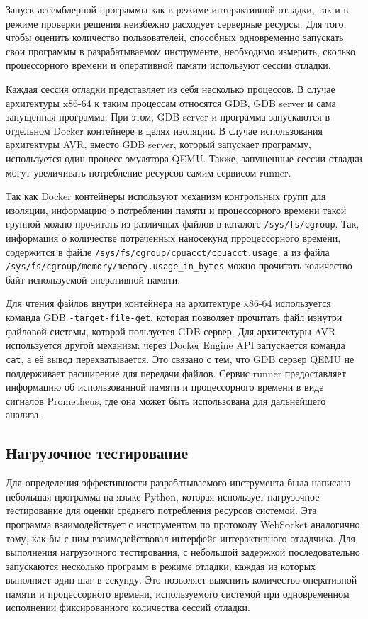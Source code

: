 \documentclass[a4paper,article,14pt]{extarticle}
\begin{document}
Запуск ассемблерной программы как в режиме интерактивной отладки, так и в режиме проверки решения неизбежно расходует серверные ресурсы. Для того, чтобы оценить количество пользователей, способных одновременно запускать свои программы в разрабатываемом инструменте, необходимо измерить, сколько процессорного времени и оперативной памяти используют сессии отладки.

Каждая сессия отладки представляет из себя несколько процессов. В случае архитектуры x86-64 к таким процессам относятся GDB, GDB server и сама запущенная программа. При этом, GDB server и программа запускаются в отдельном Docker контейнере в целях изоляции. В случае использования архитектуры AVR, вместо GDB server, который запускает программу, используется один процесс эмулятора QEMU. Также, запущенные сессии отладки могут увеличивать потребление ресурсов самим сервисом runner.

Так как Docker контейнеры используют механизм контрольных групп для изоляции, информацию о потреблении памяти и процессорного времени такой группой можно прочитать из различных файлов в каталоге \texttt{/sys/fs/cgroup}. Так, информация о количестве потраченных наносекунд прроцессорного времени, содержится в файле \texttt{/sys/fs/cgroup/cpuacct/cpuacct.usage}, а из файла \texttt{/sys/fs/cgroup/memory/memory.usage\_in\_bytes} можно прочитать количество байт используемой оперативной памяти.

Для чтения файлов внутри контейнера на архитектуре x86-64 используется команда GDB \texttt{-target-file-get}, которая позволяет прочитать файл изнутри файловой системы, которой пользуется GDB сервер. Для архитектуры AVR используется другой механизм: через Docker Engine API запускается команда \texttt{cat}, а её вывод перехватывается. Это связано с тем, что GDB сервер QEMU не поддерживает расширение для передачи файлов. Сервис runner предоставляет информацию об использованной памяти и процессорного времени в виде сигналов Prometheus, где она может быть использована для дальнейшего анализа.

\subsection{Нагрузочное тестирование}

Для определения эффективности разрабатываемого инструмента была написана небольшая программа на языке Python, которая использует нагрузочное тестирование для оценки среднего потребления ресурсов системой. Эта программа взаимодействует с инструментом по протоколу WebSocket аналогично тому, как бы с ним взаимодействовал интерфейс интерактивного отладчика. Для выполнения нагрузочного тестирования, с небольшой задержкой последовательно запускаются несколько программ в режиме отладки, каждая из которых выполняет один шаг в секунду. Это позволяет выяснить количество оперативной памяти и процессорного времени, используемого системой при одновременном исполнении фиксированного количества сессий отладки.
\end{document}
